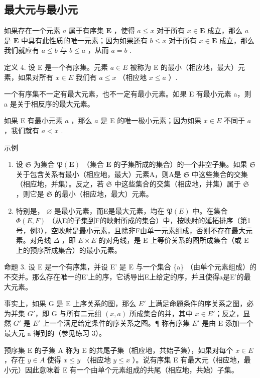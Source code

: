 \subsection{最大元与最小元}

如果存在一个元素 \(a\) 属于有序集 \(\mathbf{E}\) ，使得 \(a \leqslant x\) 对于所有 \(x \in \mathbf{E}\) 成立，那么 \(a\) 是 \(\mathbf{E}\) 中具有此性质的唯一元素；因为如果还有 \(b \leqslant x\) 对于所有 \(x \in \mathbf{E}\) 成立，那么我们就应有 \(a \leqslant b\) 与 \(b \leqslant a\) ，从而 \(a = b\) .

定义 4. 设 E 是一个有序集。元素 \(a \in E\) 被称为 E 的最小（相应地，最大）元素，如果对所有 \(x \in E\) 我们有 \(a \leqslant x\) （相应地 \(x \leqslant a\) ）.

一个有序集不一定有最大元素，也不一定有最小元素。如果 E 有最小元素 a，则 a 是关于相反序的最大元素。

如果 E 有最小元素 \(a\) ，那么 \(a\) 是 E 的唯一极小元素；因为如果 \(x \in E\) 不同于 \(a\) ，我们就有 \(a < x\) .

示例

\begin{enumerate}
\def\labelenumi{(\arabic{enumi})}
\item
  设 \(\mathfrak{S}\) 为集合 \(\mathfrak{P}(\mathbf{E})\) （集合 \(\mathbf{E}\) 的子集所成的集合）的一个非空子集。如果 \(\mathfrak{S}\) 关于包含关系有最小（相应地，最大）元素A，则A是 \(\mathfrak{S}\) 中这些集合的交集（相应地，并集）。反之，若 \(\mathfrak{S}\) 中这些集合的交集（相应地，并集）属于 \(\mathfrak{S}\) ，则它是 \(\mathfrak{S}\) 的最小（相应地，最大）元素。
\item
  特别是， \(\varnothing\) 是最小元素，而E是最大元素，均在 \(\mathfrak{P}(E)\) 中。在集合 \(\Phi(E, F)\) （从E的子集到F的映射所成的集合）中，按映射的延拓排序（第1号，例3），空映射是最小元素，且除非F由单一元素组成，否则不存在最大元素。对角线 \(\Delta\) ，即 \(E \times E\) 的对角线，是 E 上等价关系的图所成集合（或 E 上的预序所成集合）的最小元素。
\end{enumerate}

命题 3. 设 E 是一个有序集，并设 E' 是 E 与一个集合 \{a\} （由单个元素组成）的不交并。那么存在唯一的E'上的序，它诱导出E上给定的序，并且使得a是E'的最大元素。

事实上，如果 G 是 E 上序关系的图，那么 \(E'\) 上满足命题条件的序关系之图，必为并集 \(G'\)，即 G 与所有二元组 \((x, a)\) 所成集合的并，其中 \(x \in E'\)；反之，显然 \(G'\) 是 \(E'\) 上一个满足给定条件的序关系之图。¶ 称有序集 \(E'\) 是由 E 添加一个最大元 a 得到的（参见练习 3）。

预序集 E 的子集 A 称为 E 的共尾子集（相应地，共始子集），如果对每个 \(x \in E\) ，存在 \(y \in A\) 使得 \(x \leqslant y\) （相应地 \(y \leqslant x\) ）。说有序集 E 有最大元（相应地，最小元）因此意味着 E 有一个由单个元素组成的共尾（相应地，共始）子集。

